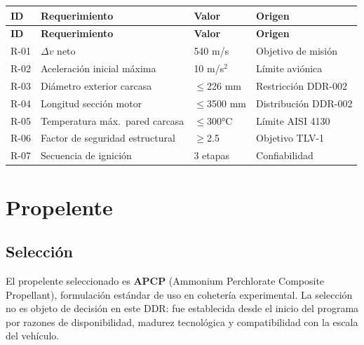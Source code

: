 \documentclass[11pt, a4paper]{article}
\begin{document}
\begin{longtable}{C{1cm} L{5.5cm} C{2.5cm} L{4.5cm}}
  \color{white}\textbf{ID} &
  \color{white}\textbf{Requerimiento} &
  \color{white}\textbf{Valor} &
  \color{white}\textbf{Origen} \\
  \endfirsthead
  \color{white}\textbf{ID} &
  \color{white}\textbf{Requerimiento} &
  \color{white}\textbf{Valor} &
  \color{white}\textbf{Origen} \\
  \endhead
  R-01 & $\Delta v$ neto & 540 m/s & Objetivo de misi\'{o}n \\
  R-02 & Aceleraci\'{o}n inicial m\'{a}xima & 10 m/s$^2$ & L\'{i}mite aviónica \\
  R-03 & Di\'{a}metro exterior carcasa & $\leq$226 mm & Restricci\'{o}n DDR-002 \\
  R-04 & Longitud secci\'{o}n motor & $\leq$3500 mm & Distribuci\'{o}n DDR-002 \\
  R-05 & Temperatura m\'{a}x.\ pared carcasa & $\leq$300°C & L\'{i}mite AISI 4130 \\
  R-06 & Factor de seguridad estructural & $\geq$2.5 & Objetivo TLV-1 \\
  R-07 & Secuencia de ignici\'{o}n & 3 etapas & Confiabilidad \\
\end{longtable}

\section{Propelente}

\subsection{Selecci\'{o}n}

El propelente seleccionado es \textbf{APCP} (Ammonium Perchlorate Composite Propellant), formulaci\'{o}n est\'{a}ndar de uso en coheter\'{i}a experimental. La selecci\'{o}n no es objeto de decisi\'{o}n en este DDR: fue establecida desde el inicio del programa por razones de disponibilidad, madurez tecnol\'{o}gica y compatibilidad con la escala del veh\'{i}culo.
\end{document}
